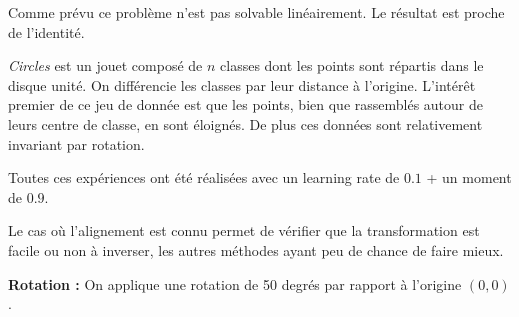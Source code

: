 Comme prévu ce problème n'est pas solvable linéairement. Le résultat est proche de l'identité.


\emph{Circles} est un jouet composé de $n$ classes dont les points sont répartis dans le disque unité.
On différencie les classes par leur distance à l'origine. 
L'intérêt premier de ce jeu de donnée est que les points, bien que rassemblés autour de leurs centre de classe,
en sont éloignés. De plus ces données sont relativement invariant par rotation.

Toutes ces expériences ont été réalisées avec un learning rate de $0.1$ + un moment de $0.9$.


Le cas où l'alignement est connu permet de vérifier que la transformation est facile ou non 
à inverser, les autres méthodes ayant peu de chance de faire mieux.

{\Large \textbf{Rotation :}} On applique une rotation de 50 degrés par rapport à l'origine $(0,0)$.

